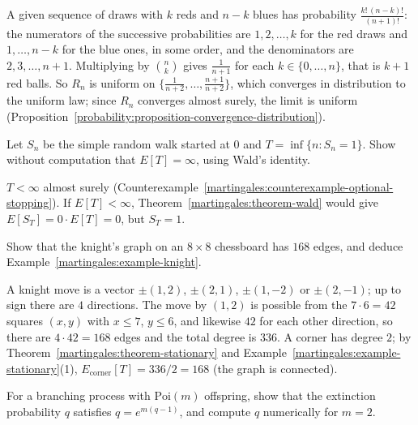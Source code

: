 \begin{solution}
A given sequence of draws with $k$ reds and $n - k$ blues has probability $\frac{k!\,(n - k)!}{(n + 1)!}$: the numerators of the successive probabilities are $1, 2, \ldots, k$ for the red draws and $1, \ldots, n - k$ for the blue ones,
in some order, and the denominators are $2, 3, \ldots, n + 1$. Multiplying by $\binom nk$ gives $\frac{1}{n + 1}$ for each $k \in \{0, \ldots, n\}$, that is $k + 1$ red balls. So $R_n$ is uniform on $\{\frac{1}{n + 2}, \ldots, \frac{n + 1}{n + 2}\}$, which
converges in distribution to the uniform law; since $R_n$ converges almost surely, the limit is uniform (Proposition~\ref{probability:proposition-convergence-distribution}).
\end{solution}

\begin{exercise}\label{martingales:exercise-walk-expected-time}
Let $S_n$ be the simple random walk started at $0$ and $T = \inf\{n : S_n = 1\}$. Show without computation that $E[T] = \infty$, using Wald's identity.
\end{exercise}

\begin{solution}
$T < \infty$ almost surely (Counterexample~\ref{martingales:counterexample-optional-stopping}). If $E[T] < \infty$, Theorem~\ref{martingales:theorem-wald} would give $E[S_T] = 0\cdot E[T] = 0$, but $S_T = 1$.
\end{solution}

\begin{exercise}\label{martingales:exercise-knight}
Show that the knight's graph on an $8 \times 8$ chessboard has $168$ edges, and deduce Example~\ref{martingales:example-knight}.
\end{exercise}

\begin{solution}
A knight move is a vector $\pm(1, 2)$, $\pm(2, 1)$, $\pm(1, -2)$ or $\pm(2, -1)$; up to sign there are $4$ directions. The move by $(1, 2)$ is possible from the $7 \cdot 6 = 42$ squares $(x, y)$ with $x \leq 7$, $y \leq 6$, and likewise $42$
for each other direction, so there are $4 \cdot 42 = 168$ edges and the total degree is $336$. A corner has degree $2$; by Theorem~\ref{martingales:theorem-stationary} and Example~\ref{martingales:example-stationary}(1),
$E_{\text{corner}}[T] = 336/2 = 168$ (the graph is connected).
\end{solution}

\begin{exercise}\label{martingales:exercise-branching-poisson}
For a branching process with $\mathrm{Poi}(m)$ offspring, show that the extinction probability $q$ satisfies $q = e^{m(q - 1)}$, and compute $q$ numerically for $m = 2$.
\end{exercise}

